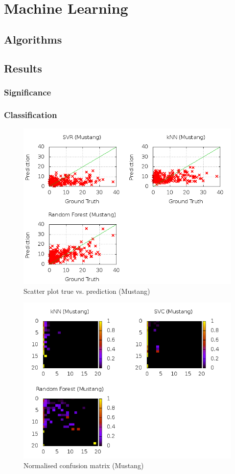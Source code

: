 \chapter{Machine Learning}
\section{Algorithms}
\section{Results}
\subsection{Significance}
\subsection{Classification}
\begin{figure}
\centering
\includegraphics[scale=0.55]{images/plots/machine_learning/mustang/true_pred_mustang.png}
\caption{Scatter plot true vs. prediction (Mustang)}
\label{true_predict_mustang}
\end{figure}
\begin{figure}
\centering
\includegraphics[scale=0.55]{images/plots/machine_learning/mustang/conf_mat_mustang.png}
\caption{Normalised confusion matrix (Mustang)}
\label{conf_mat_mustang}
\end{figure}
